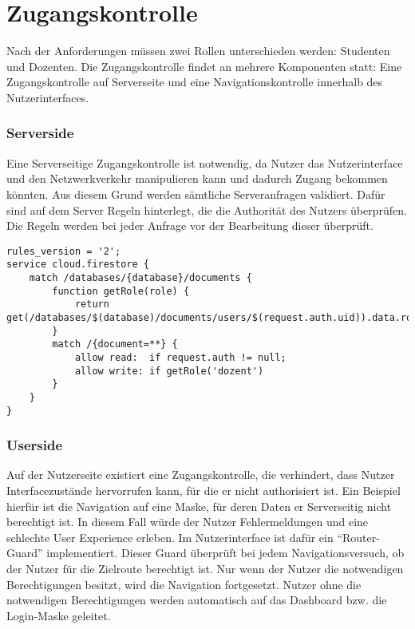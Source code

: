 \section{Zugangskontrolle}
Nach der Anforderungen müssen zwei Rollen unterschieden werden: Studenten und Dozenten.
Die Zugangskontrolle findet an mehrere Komponenten statt: Eine Zugangskontrolle auf Serverseite und eine Navigationskontrolle innerhalb des Nutzerinterfaces.


\subsubsection*{Serverside}
Eine Serverseitige Zugangskontrolle ist notwendig, da Nutzer das Nutzerinterface und den Netzwerkverkehr manipulieren kann und dadurch Zugang bekommen könnten.
Aus diesem Grund werden sämtliche Serveranfragen validiert.
Dafür sind auf dem Server Regeln hinterlegt, die die Authorität des Nutzers überprüfen.
Die Regeln werden bei jeder Anfrage vor der Bearbeitung dieser überprüft.

\begin{lstlisting}[caption={Einfaches Beispiel der Serverside Regeln}, label=lst:firestoreRules]
rules_version = '2';
service cloud.firestore {
    match /databases/{database}/documents {
        function getRole(role) {
            return get(/databases/$(database)/documents/users/$(request.auth.uid)).data.roles[role]
        }
        match /{document=**} {
            allow read:  if request.auth != null;
            allow write: if getRole('dozent')
        }
    }
}\end{lstlisting}


\subsubsection*{Userside}
Auf der Nutzerseite existiert eine Zugangskontrolle, die verhindert, dass Nutzer Interfacezustände hervorrufen kann, für die er nicht authorisiert ist.
Ein Beispiel hierfür ist die Navigation auf eine Maske, für deren Daten er Serverseitig nicht berechtigt ist.
In diesem Fall würde der Nutzer Fehlermeldungen und eine schlechte User Experience erleben.
Im Nutzerinterface ist dafür ein \enquote{Router-Guard} implementiert.
Dieser Guard überprüft bei jedem Navigationsversuch, ob der Nutzer für die Zielroute berechtigt ist.
Nur wenn der Nutzer die notwendigen Berechtigungen besitzt, wird die Navigation fortgesetzt.
Nutzer ohne die notwendigen Berechtigungen werden automatisch auf das Dashboard bzw. die Login-Maske geleitet.




